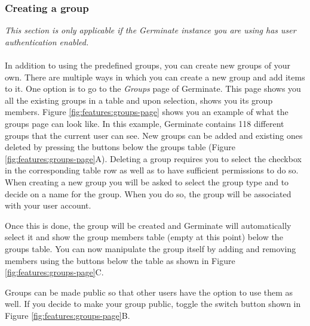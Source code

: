 \subsubsection{Creating a group}
\textit{This section is only applicable if the Germinate instance you are using has user authentication enabled.}\\
\\
In addition to using the predefined groups, you can create new groups of your own. There are multiple ways in which you can create a new group and add items to it. One option is to go to the \textit{Groups} page of Germinate. This page shows you all the existing groups in a table and upon selection, shows you its group members. Figure \ref{fig:features:groups-page} shows you an example of what the groups page can look like. In this example, Germinate contains 118 different groups that the current user can see. New groups can be added and existing ones deleted by pressing the buttons below the groups table (Figure \ref{fig:features:groups-page}A). Deleting a group requires you to select the checkbox in the corresponding table row as well as to have sufficient permissions to do so. When creating a new group you will be asked to select the group type and to decide on a name for the group. When you do so, the group will be associated with your user account.

Once this is done, the group will be created and Germinate will automatically select it and show the group members table (empty at this point) below the groups table. You can now manipulate the group itself by adding and removing members using the buttons below the table as shown in Figure \ref{fig:features:groups-page}C. 

Groups can be made public so that other users have the option to use them as well. If you decide to make your group public, toggle the switch button shown in Figure \ref{fig:features:groups-page}B.

